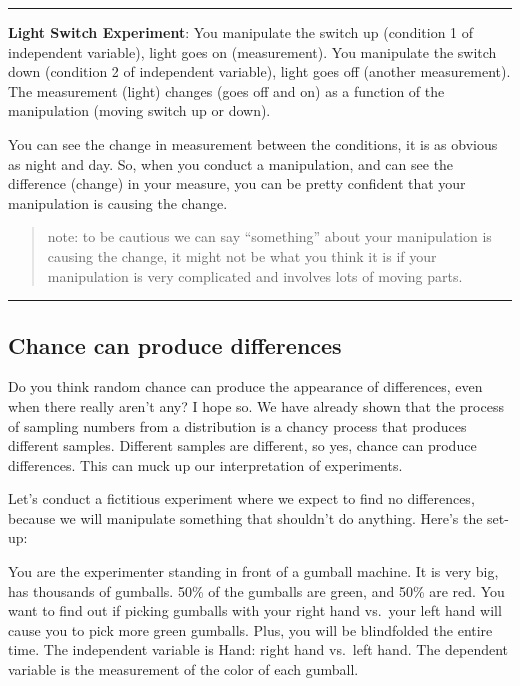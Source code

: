 \documentclass[
  letterpaper,
  DIV=11,
  numbers=noendperiod]{scrreprt}
\begin{document}
\begin{center}\rule{0.5\linewidth}{0.5pt}\end{center}

\textbf{Light Switch Experiment}: You manipulate the switch up
(condition 1 of independent variable), light goes on (measurement). You
manipulate the switch down (condition 2 of independent variable), light
goes off (another measurement). The measurement (light) changes (goes
off and on) as a function of the manipulation (moving switch up or
down).

You can see the change in measurement between the conditions, it is as
obvious as night and day. So, when you conduct a manipulation, and can
see the difference (change) in your measure, you can be pretty confident
that your manipulation is causing the change.

\begin{quote}
note: to be cautious we can say ``something'' about your manipulation is
causing the change, it might not be what you think it is if your
manipulation is very complicated and involves lots of moving parts.
\end{quote}

\begin{center}\rule{0.5\linewidth}{0.5pt}\end{center}

\subsection{Chance can produce
differences}\label{chance-can-produce-differences}

Do you think random chance can produce the appearance of differences,
even when there really aren't any? I hope so. We have already shown that
the process of sampling numbers from a distribution is a chancy process
that produces different samples. Different samples are different, so
yes, chance can produce differences. This can muck up our interpretation
of experiments.

Let's conduct a fictitious experiment where we expect to find no
differences, because we will manipulate something that shouldn't do
anything. Here's the set-up:

You are the experimenter standing in front of a gumball machine. It is
very big, has thousands of gumballs. 50\% of the gumballs are green, and
50\% are red. You want to find out if picking gumballs with your right
hand vs.~your left hand will cause you to pick more green gumballs.
Plus, you will be blindfolded the entire time. The independent variable
is Hand: right hand vs.~left hand. The dependent variable is the
measurement of the color of each gumball.
\end{document}
